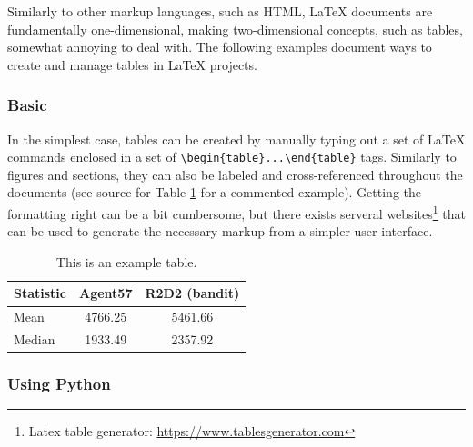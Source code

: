 Similarly to other markup languages, such as HTML, LaTeX documents are fundamentally one-dimensional, making two-dimensional concepts, such as tables, somewhat annoying to deal with. The following examples document ways to create and manage tables in LaTeX projects.

\subsubsection{Basic}

In the simplest case, tables can be created by manually typing out a set of LaTeX commands enclosed in a set of \verb|\begin{table}...\end{table}| tags.
Similarly to figures and sections, they can also be labeled and cross-referenced throughout the documents (see source for Table \ref{tab:example-table} for a commented example).
Getting the formatting right can be a bit cumbersome, but there exists serveral websites\footnote{Latex table generator: \url{https://www.tablesgenerator.com}} that can be used to generate the necessary markup from a simpler user interface.

\begin{table}[H]  
    \centering
    \begin{tabular}{l|cc} 
        \toprule
        Statistic &  Agent57 &  R2D2 (bandit) \\
        \midrule
        Mean   &  4766.25 &        5461.66 \\
        Median &  1933.49 &        2357.92 \\
        \bottomrule
    \end{tabular}
    \caption{This is an example table.}
    \label{tab:example-table}
\end{table}

\subsubsection{Using Python}

